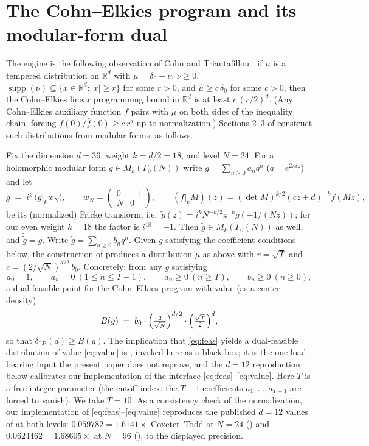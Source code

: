 \documentclass[11pt]{article}
\theoremstyle{remark}
\newcommand{\LP}{\mathrm{LP}}
\newcommand{\R}{\mathbb{R}}
\begin{document}
\section{The Cohn--Elkies program and its modular-form dual}
\label{sec:dual}

The engine is the following observation of Cohn and Triantafillou
\cite[Prop.~2.1]{CT}: if $\mu$ is a tempered distribution on $\R^d$
with $\mu=\delta_0+\nu$, $\nu\ge0$,
$\operatorname{supp}(\nu)\subseteq\{x\in\R^d:|x|\ge r\}$ for some
$r>0$, and $\hat\mu\ge c\,\delta_0$ for some $c>0$, then the
Cohn--Elkies linear programming bound in $\R^d$ is at least
$c\,(r/2)^d$. (Any Cohn--Elkies auxiliary function $f$ pairs with $\mu$
on both sides of the inequality chain, forcing
$f(0)/\hat f(0)\ge c\,r^d$ up to normalization.) Sections 2--3 of
\cite{CT} construct such distributions from modular forms, as follows.

Fix the dimension $d=36$, weight $k=d/2=18$, and level $N=24$. For a
holomorphic modular form $g\in M_k(\Gamma_0(N))$ write
$g=\sum_{n\ge0}a_n q^n$ ($q=e^{2\pi iz}$) and let
\[
\tilde g \;=\; i^{k}\,\bigl(g\big|_k w_N\bigr),
\qquad
w_N=\begin{pmatrix}0&-1\\ N&0\end{pmatrix},
\qquad
(f|_k M)(z)=(\det M)^{k/2}(cz+d)^{-k}f(Mz),
\]
be its (normalized) Fricke transform, i.e.\
$\tilde g(z)=i^kN^{-k/2}z^{-k}g(-1/(Nz))$; for our even weight $k=18$
the factor is $i^{18}=-1$. Then
$\tilde g\in M_k(\Gamma_0(N))$ as well, and
$\tilde{\tilde g}=g$. Write $\tilde g=\sum_{n\ge0}b_nq^n$. Given $g$
satisfying the coefficient conditions below, the construction of
\cite[\S\S2--3]{CT} produces a distribution $\mu$ as above with
$r=\sqrt T$ and $c=(2/\sqrt N)^{d/2}\,b_0$. Concretely: from any $g$
satisfying
\begin{equation}\label{eq:feas}
a_0=1,\qquad a_n=0\ (1\le n\le T-1),\qquad a_n\ge 0\ (n\ge T),
\qquad b_n\ge 0\ (n\ge 0),
\end{equation}
a dual-feasible point for the Cohn--Elkies program with value (as a
center density)
\begin{equation}\label{eq:value}
B(g)\;=\;b_0\cdot\Bigl(\tfrac{2}{\sqrt N}\Bigr)^{d/2}\cdot
\Bigl(\tfrac{\sqrt T}{2}\Bigr)^{d},
\end{equation}
so that $\delta_{\LP}(d)\ge B(g)$. The implication that \eqref{eq:feas}
yields a dual-feasible distribution of value \eqref{eq:value} is
\cite[Prop.~2.1 and \S\S2--3]{CT}, invoked here as a black box; it is the
one load-bearing input the present paper does not reprove, and the $d=12$
reproduction below calibrates our implementation of the interface
\eqref{eq:feas}--\eqref{eq:value}. Here $T$ is a free integer parameter
(the cutoff index: the $T-1$ coefficients $a_1,\dots,a_{T-1}$ are forced
to vanish). We take $T=10$. As a consistency
check of the normalization, our implementation of
\eqref{eq:feas}--\eqref{eq:value} reproduces the published $d=12$
values of \cite{CT} at both levels: $0.059782=1.6141\times$
Coxeter--Todd at $N=24$ (\cite[Table~6.1]{CT}) and
$0.0624462=1.68605\times$ at $N=96$ (\cite[Thm.~1.1]{CT}), to the
displayed precision.
\end{document}
